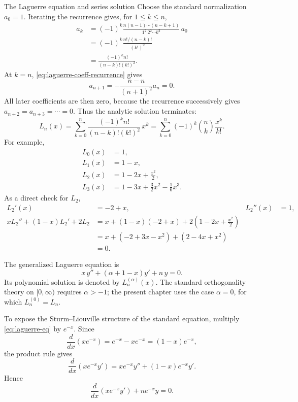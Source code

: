 \documentclass[11pt]{beamer}
\begin{document}
\begin{frame}[allowframebreaks]{The Laguerre equation and series solution}
Choose the standard normalization $a_0=1$.  Iterating the recurrence gives, for
$1\le k\le n$,
\begin{align*}
  a_k
   &=(-1)^k
     \frac{n(n-1)\cdots(n-k+1)}
          {1^2\,2^2\cdots k^2}\,a_0\\
   &=(-1)^k
     \frac{n!/(n-k)!}{(k!)^2}\\
   &=\frac{(-1)^k n!}{(n-k)!(k!)^2}.
\end{align*}
At $k=n$, \eqref{eq:laguerre-coeff-recurrence} gives
\[
  a_{n+1}=-\frac{n-n}{(n+1)^2}a_n=0.
\]
All later coefficients are then zero, because the recurrence successively gives
$a_{n+2}=a_{n+3}=\cdots=0$.  Thus the analytic solution terminates:
\begin{equation}
  L_n(x)
   =\sum_{k=0}^{n}
      \frac{(-1)^k n!}{(n-k)!(k!)^2}\,x^k
   =\sum_{k=0}^{n}
      (-1)^k\binom{n}{k}\frac{x^k}{k!}.
  \label{eq:laguerre-series}
\end{equation}
For example,
\begin{align*}
  L_0(x)
    &=1,\\
  L_1(x)
    &=1-x,\\
  L_2(x)
    &=1-2x+\frac{x^2}{2},\\
  L_3(x)
    &=1-3x+\frac{3}{2}x^2-\frac{1}{6}x^3.
\end{align*}
As a direct check for $L_2$,
\begin{align*}
  L_2'(x)&=-2+x,
  &
  L_2''(x)&=1,\\
  xL_2''+(1-x)L_2'+2L_2
    &=x+(1-x)(-2+x)+2\left(1-2x+\frac{x^2}{2}\right)\\
    &=x+\left(-2+3x-x^2\right)
      +\left(2-4x+x^2\right)\\
    &=0.
\end{align*}

The generalized Laguerre equation is
\[
  x\,y''+(\alpha+1-x)y'+n\,y=0.
\]
Its polynomial solution is denoted by $L_n^{(\alpha)}(x)$.  The standard
orthogonality theory on $[0,\infty)$ requires $\alpha>-1$; the present chapter uses
the case $\alpha=0$, for which $L_n^{(0)}=L_n$.

\medskip
To expose the Sturm--Liouville structure of the standard equation, multiply
\eqref{eq:laguerre-eq} by $e^{-x}$.  Since
\[
  \frac{d}{dx}\!\left(xe^{-x}\right)
    =e^{-x}-xe^{-x}
    =(1-x)e^{-x},
\]
the product rule gives
\[
  \frac{d}{dx}\!\left(xe^{-x}y'\right)
    =xe^{-x}y''+(1-x)e^{-x}y'.
\]
Hence
\begin{equation}
  \frac{d}{dx}\!\left(xe^{-x}y'\right)
   +n e^{-x}y=0 .
  \label{eq:laguerre-sl}
\end{equation}


\end{frame}
\end{document}
